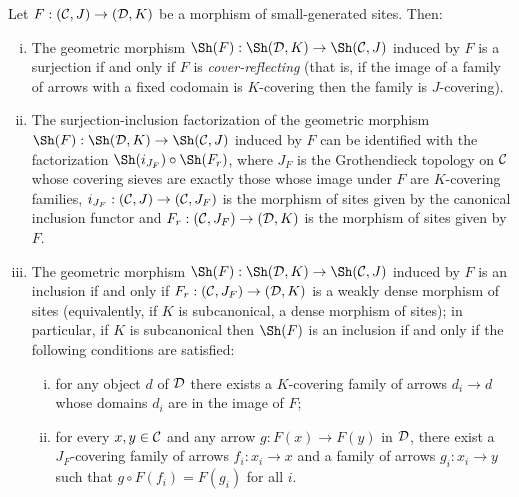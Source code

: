 \documentclass[a4paper,12pt]{article}
\begin{document}
\begin{theorem}\label{Morphismsmaalgenerated}
	Let $F:({\cal C}, J)\to ({\cal D}, K)$ be a morphism of small-generated sites. Then:
	
	\begin{enumerate}[(i)]
		\item The geometric morphism $\Sh(F):\Sh({\cal D}, K) \to \Sh({\cal C}, J)$ induced by $F$ is a surjection if and only if $F$ is \emph{cover-reflecting} (that is, if the image of a family of arrows with a fixed codomain is $K$-covering then the family is $J$-covering).
		
		\item The surjection-inclusion factorization of the geometric morphism $\Sh(F):\Sh({\cal D}, K) \to \Sh({\cal C}, J)$ induced by $F$ can be identified with the factorization $\Sh(i_{J_{F}})\circ \Sh(F_{r})$, 
		where $J_{F}$ is the Grothendieck topology on $\cal C$ whose covering sieves are exactly those whose image under $F$ are $K$-covering families, $i_{J_{F}}:({\cal C}, J)\to ({\cal C}, J_{F})$ is the morphism of sites given by the canonical inclusion functor and $F_{r}: ({\cal C}, J_{F}) \to ({\cal D}, K)$ is the morphism of sites given by $F$. 
		
		\item The geometric morphism $\Sh(F):\Sh({\cal D}, K) \to \Sh({\cal C}, J)$ induced by $F$ is an inclusion if and only if $F_{r}: ({\cal C}, J_{F}) \to ({\cal D}, K)$ is a weakly dense morphism of sites (equivalently, if $K$ is subcanonical, a dense morphism of sites); in particular, if $K$ is subcanonical then $\Sh(F)$ is an inclusion if and only if the following conditions are satisfied:
		
		\begin{enumerate}[(i)]	
			\item for any object $d$ of $\cal D$ there exists a $K$-covering family of arrows $d_{i}\to d$ whose domains $d_{i}$ are in the image of $F$;
			\item for every $x, y\in {\cal C}$ and any arrow $g:F(x)\to F(y)$ in $\cal D$, there exist a $J_{F}$-covering family of arrows $f_{i}:x_{i}\to x$ and a family of arrows $g_{i}:x_{i}\to y$ such that $g\circ F(f_{i})=F(g_{i})$ for all $i$.
		\end{enumerate}
	\end{enumerate}
\end{theorem}
\end{document}
